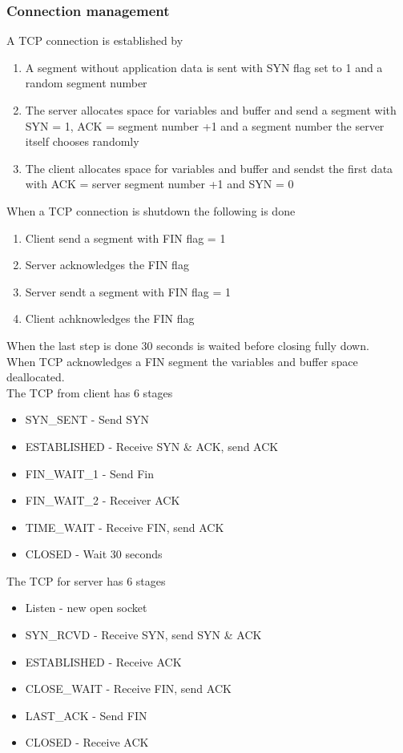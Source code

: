 \documentclass[12pt, a4paper]{article}
\begin{document}
			\subsubsection{Connection management}
				A TCP connection is established by
				\begin{enumerate}
					\item A segment without application data is sent with SYN flag set to 1 and a random segment number
					\item The server allocates space for variables and buffer and send a segment with SYN = 1, ACK = segment number +1 and a segment number the server itself chooses randomly
					\item The client allocates space for variables and buffer and sendst the first data with ACK = server segment number +1 and SYN = 0
				\end{enumerate}
				When a TCP connection is shutdown the following is done
				\begin{enumerate}
					\item Client send a segment with FIN flag = 1
					\item Server acknowledges the FIN flag
					\item Server sendt a segment with FIN flag = 1
					\item Client achknowledges the FIN flag 
				\end{enumerate}
				When the last step is done 30 seconds is waited before closing fully down.\\
				When TCP acknowledges a FIN segment the variables and buffer space deallocated.\\
				The TCP from client has 6 stages
				\begin{itemize}	
					\item SYN\_SENT - Send SYN
					\item ESTABLISHED - Receive SYN \& ACK, send ACK
					\item FIN\_WAIT\_1 - Send Fin
					\item FIN\_WAIT\_2 - Receiver ACK
					\item TIME\_WAIT - Receive FIN, send ACK
					\item CLOSED - Wait 30 seconds
				\end{itemize}
				The TCP for server has 6 stages
				\begin{itemize}
					\item Listen - new open socket
					\item SYN\_RCVD - Receive SYN, send SYN \& ACK
					\item ESTABLISHED - Receive ACK
					\item CLOSE\_WAIT - Receive FIN, send ACK
					\item LAST\_ACK - Send FIN
					\item CLOSED - Receive ACK
				\end{itemize}
				
\end{document}
